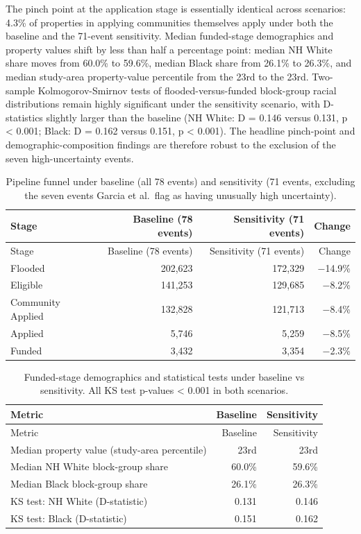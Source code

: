 \documentclass[
  authoryear,
  preprint]{elsarticle}
\begin{document}
The pinch point at the application stage is essentially identical across
scenarios: 4.3\% of properties in applying communities themselves apply
under both the baseline and the 71-event sensitivity. Median
funded-stage demographics and property values shift by less than half a
percentage point: median NH White share moves from 60.0\% to 59.6\%,
median Black share from 26.1\% to 26.3\%, and median study-area
property-value percentile from the 23rd to the 23rd. Two-sample
Kolmogorov-Smirnov tests of flooded-versus-funded block-group racial
distributions remain highly significant under the sensitivity scenario,
with D-statistics slightly larger than the baseline (NH White: D = 0.146
versus 0.131, p \textless{} 0.001; Black: D = 0.162 versus 0.151, p
\textless{} 0.001). The headline pinch-point and demographic-composition
findings are therefore robust to the exclusion of the seven
high-uncertainty events.

\begin{longtable}[]{@{}lrrr@{}}
\caption{Pipeline funnel under baseline (all 78 events) and sensitivity
(71 events, excluding the seven events Garcia et al.~flag as having
unusually high uncertainty).}\label{tbl-sens-funnel}\tabularnewline
\toprule\noalign{}
Stage & Baseline (78 events) & Sensitivity (71 events) & Change \\
\midrule\noalign{}
\endfirsthead
\toprule\noalign{}
Stage & Baseline (78 events) & Sensitivity (71 events) & Change \\
\midrule\noalign{}
\endhead
\bottomrule\noalign{}
\endlastfoot
Flooded & 202,623 & 172,329 & −14.9\% \\
Eligible & 141,253 & 129,685 & −8.2\% \\
Community Applied & 132,828 & 121,713 & −8.4\% \\
Applied & 5,746 & 5,259 & −8.5\% \\
Funded & 3,432 & 3,354 & −2.3\% \\
\end{longtable}

\begin{longtable}[]{@{}lrr@{}}
\caption{Funded-stage demographics and statistical tests under baseline
vs sensitivity. All KS test p-values \textless{} 0.001 in both
scenarios.}\label{tbl-sens-medians}\tabularnewline
\toprule\noalign{}
Metric & Baseline & Sensitivity \\
\midrule\noalign{}
\endfirsthead
\toprule\noalign{}
Metric & Baseline & Sensitivity \\
\midrule\noalign{}
\endhead
\bottomrule\noalign{}
\endlastfoot
Median property value (study-area percentile) & 23rd & 23rd \\
Median NH White block-group share & 60.0\% & 59.6\% \\
Median Black block-group share & 26.1\% & 26.3\% \\
KS test: NH White (D-statistic) & 0.131 & 0.146 \\
KS test: Black (D-statistic) & 0.151 & 0.162 \\
\end{longtable}
\end{document}
